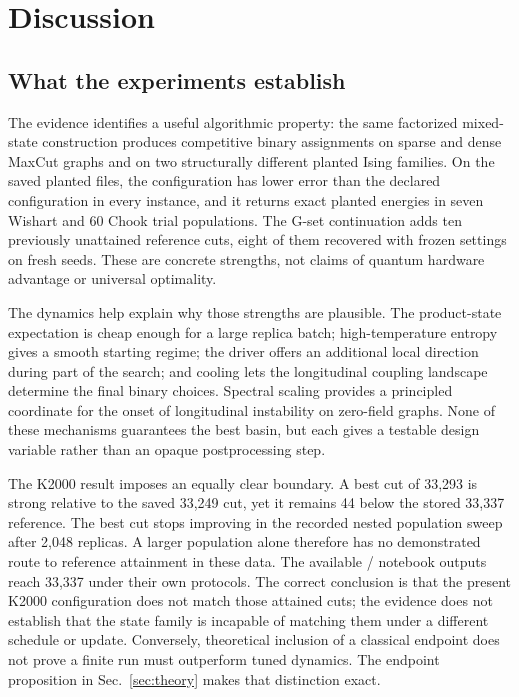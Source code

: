 \section{Discussion}
\label{sec:discussion}

\subsection{What the experiments establish}

The evidence identifies a useful algorithmic property: the same
factorized mixed-state construction produces competitive binary
assignments on sparse and dense MaxCut graphs and on two structurally
different planted Ising families. On the saved planted files, the
\QeFEM{} configuration has lower error than the declared \LQA{}
configuration in every instance, and it returns exact planted energies
in seven Wishart and 60 Chook trial populations. The G-set continuation
adds ten previously unattained reference cuts, eight of them recovered
with frozen settings on fresh seeds. These are concrete strengths, not
claims of quantum hardware advantage or universal optimality.

The dynamics help explain why those strengths are plausible. The
product-state expectation is cheap enough for a large replica batch;
high-temperature entropy gives a smooth starting regime; the driver
offers an additional local direction during part of the search; and
cooling lets the longitudinal coupling landscape determine the final
binary choices. Spectral scaling provides a principled coordinate for
the onset of longitudinal instability on zero-field graphs. None of
these mechanisms guarantees the best basin, but each gives a testable
design variable rather than an opaque postprocessing step.

The K2000 result imposes an equally clear boundary. A best cut of 33,293
is strong relative to the saved 33,249 \LQA{} cut, yet it remains 44
below the stored 33,337 reference. The best cut stops improving in the
recorded nested population sweep after 2,048 replicas. A larger
population alone therefore has no demonstrated route to reference
attainment in these data. The available \FEM{}/\dSB{} notebook outputs
reach 33,337 under their own protocols. The correct conclusion is that
the present \QeFEM{} K2000 configuration does not match those attained
cuts; the evidence does not establish that the state family is incapable
of matching them under a different schedule or update. Conversely,
theoretical inclusion of a classical endpoint does not prove a finite
\QeFEM{} run must outperform tuned \FEM{} dynamics. The endpoint
proposition in Sec.~\ref{sec:theory} makes that distinction exact.

